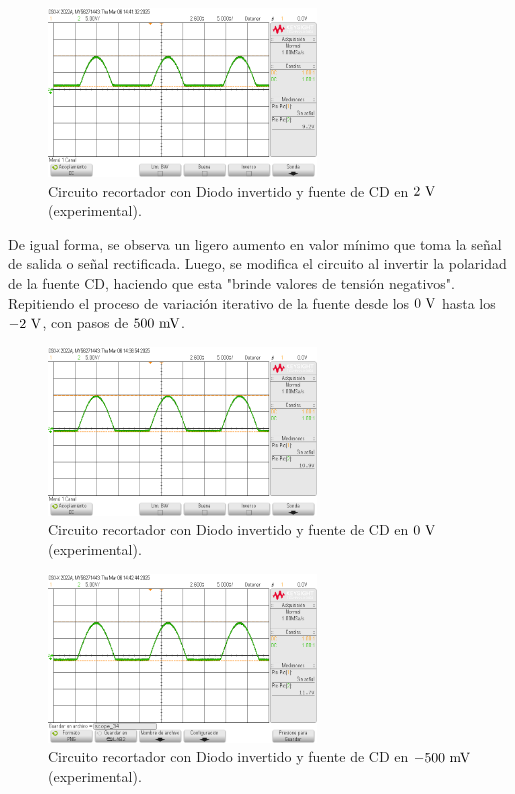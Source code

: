 \documentclass[journal]{IEEEtran}
\begin{document}
\begin{figure}[H]
        \centering
        \includegraphics[width=2.8in]{SignalExperimental_15.png}
        \caption{Circuito recortador con Diodo invertido y fuente de CD en $2~\textnormal{V}$ (experimental).}
        \label{fig:SignalExperimental_15}
\end{figure}

De igual forma, se observa un ligero aumento en valor mínimo que toma la señal de salida o señal rectificada.
Luego, se modifica el circuito al invertir la polaridad de la fuente CD, haciendo que esta "brinde valores de tensión negativos".
Repitiendo el proceso de variación iterativo de la fuente desde los $0~\textnormal{V}$ hasta los $-2~\textnormal{V}$, con pasos de $500~\textnormal{mV}$.
\begin{figure}[H]
        \centering
        \includegraphics[width=2.8in]{SignalExperimental_11.png}
        \caption{Circuito recortador con Diodo invertido y fuente de CD en $0~\textnormal{V}$ (experimental).}
        \label{fig:SignalExperimental_16}
\end{figure}
\begin{figure}[H]
        \centering
        \includegraphics[width=2.8in]{SignalExperimental_16.png}
        \caption{Circuito recortador con Diodo invertido y fuente de CD en $-500~\textnormal{mV}$ (experimental).}
        \label{fig:SignalExperimental_17}
\end{figure}
\end{document}

